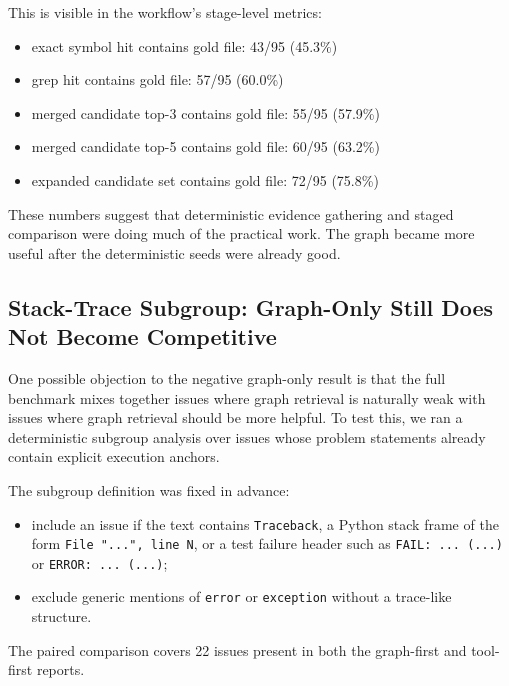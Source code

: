 \documentclass[11pt]{article}
\begin{document}
This is visible in the workflow’s stage-level metrics:

\begin{itemize}
\item exact symbol hit contains gold file: 43/95 (45.3\%)
\item grep hit contains gold file: 57/95 (60.0\%)
\item merged candidate top-3 contains gold file: 55/95 (57.9\%)
\item merged candidate top-5 contains gold file: 60/95 (63.2\%)
\item expanded candidate set contains gold file: 72/95 (75.8\%)
\end{itemize}

These numbers suggest that deterministic evidence gathering and staged comparison were doing much of the practical work. The graph became more useful after the deterministic seeds were already good.

\subsection{Stack-Trace Subgroup: Graph-Only Still Does Not Become Competitive}

One possible objection to the negative graph-only result is that the full benchmark mixes together issues where graph retrieval is naturally weak with issues where graph retrieval should be more helpful. To test this, we ran a deterministic subgroup analysis over issues whose problem statements already contain explicit execution anchors.

The subgroup definition was fixed in advance:

\begin{itemize}
\item include an issue if the text contains \texttt{Traceback}, a Python stack frame of the form \texttt{File "...", line N}, or a test failure header such as \texttt{FAIL: ... (...)} or \texttt{ERROR: ... (...)};
\item exclude generic mentions of \texttt{error} or \texttt{exception} without a trace-like structure.
\end{itemize}

The paired comparison covers 22 issues present in both the graph-first and tool-first reports.
\end{document}

